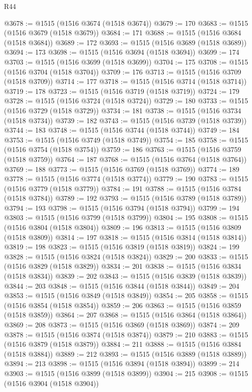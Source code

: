 \begin{lexlean}{R44}
\begin{coremodule}
{@3678 := @1515 (@1516 @3674 (@1518 @3674))
@3679 := 170
@3683 := @1515 (@1516 @3679 (@1518 @3679))
@3684 := 171
@3688 := @1515 (@1516 @3684 (@1518 @3684))
@3689 := 172
@3693 := @1515 (@1516 @3689 (@1518 @3689))
@3694 := 173
@3698 := @1515 (@1516 @3694 (@1518 @3694))
@3699 := 174
@3703 := @1515 (@1516 @3699 (@1518 @3699))
@3704 := 175
@3708 := @1515 (@1516 @3704 (@1518 @3704))
@3709 := 176
@3713 := @1515 (@1516 @3709 (@1518 @3709))
@3714 := 177
@3718 := @1515 (@1516 @3714 (@1518 @3714))
@3719 := 178
@3723 := @1515 (@1516 @3719 (@1518 @3719))
@3724 := 179
@3728 := @1515 (@1516 @3724 (@1518 @3724))
@3729 := 180
@3733 := @1515 (@1516 @3729 (@1518 @3729))
@3734 := 181
@3738 := @1515 (@1516 @3734 (@1518 @3734))
@3739 := 182
@3743 := @1515 (@1516 @3739 (@1518 @3739))
@3744 := 183
@3748 := @1515 (@1516 @3744 (@1518 @3744))
@3749 := 184
@3753 := @1515 (@1516 @3749 (@1518 @3749))
@3754 := 185
@3758 := @1515 (@1516 @3754 (@1518 @3754))
@3759 := 186
@3763 := @1515 (@1516 @3759 (@1518 @3759))
@3764 := 187
@3768 := @1515 (@1516 @3764 (@1518 @3764))
@3769 := 188
@3773 := @1515 (@1516 @3769 (@1518 @3769))
@3774 := 189
@3778 := @1515 (@1516 @3774 (@1518 @3774))
@3779 := 190
@3783 := @1515 (@1516 @3779 (@1518 @3779))
@3784 := 191
@3788 := @1515 (@1516 @3784 (@1518 @3784))
@3789 := 192
@3793 := @1515 (@1516 @3789 (@1518 @3789))
@3794 := 193
@3798 := @1515 (@1516 @3794 (@1518 @3794))
@3799 := 194
@3803 := @1515 (@1516 @3799 (@1518 @3799))
@3804 := 195
@3808 := @1515 (@1516 @3804 (@1518 @3804))
@3809 := 196
@3813 := @1515 (@1516 @3809 (@1518 @3809))
@3814 := 197
@3818 := @1515 (@1516 @3814 (@1518 @3814))
@3819 := 198
@3823 := @1515 (@1516 @3819 (@1518 @3819))
@3824 := 199
@3828 := @1515 (@1516 @3824 (@1518 @3824))
@3829 := 200
@3833 := @1515 (@1516 @3829 (@1518 @3829))
@3834 := 201
@3838 := @1515 (@1516 @3834 (@1518 @3834))
@3839 := 202
@3843 := @1515 (@1516 @3839 (@1518 @3839))
@3844 := 203
@3848 := @1515 (@1516 @3844 (@1518 @3844))
@3849 := 204
@3853 := @1515 (@1516 @3849 (@1518 @3849))
@3854 := 205
@3858 := @1515 (@1516 @3854 (@1518 @3854))
@3859 := 206
@3863 := @1515 (@1516 @3859 (@1518 @3859))
@3864 := 207
@3868 := @1515 (@1516 @3864 (@1518 @3864))
@3869 := 208
@3873 := @1515 (@1516 @3869 (@1518 @3869))
@3874 := 209
@3878 := @1515 (@1516 @3874 (@1518 @3874))
@3879 := 210
@3883 := @1515 (@1516 @3879 (@1518 @3879))
@3884 := 211
@3888 := @1515 (@1516 @3884 (@1518 @3884))
@3889 := 212
@3893 := @1515 (@1516 @3889 (@1518 @3889))
@3894 := 213
@3898 := @1515 (@1516 @3894 (@1518 @3894))
@3899 := 214
@3903 := @1515 (@1516 @3899 (@1518 @3899))
@3904 := 215
@3908 := @1515 (@1516 @3904 (@1518 @3904))
}
\end{coremodule}
\end{lexlean}
